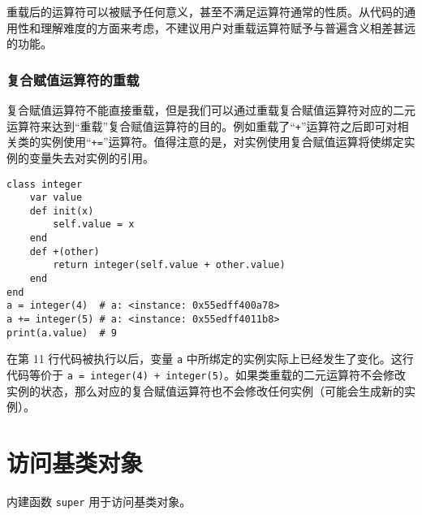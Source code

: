 重载后的运算符可以被赋予任何意义，甚至不满足运算符通常的性质。从代码的通用性和理解难度的方面来考虑，不建议用户对重载运算符赋予与普遍含义相差甚远的功能。

\subsubsection{复合赋值运算符的重载}

复合赋值运算符不能直接重载，但是我们可以通过重载复合赋值运算符对应的二元运算符来达到``重载''复合赋值运算符的目的。例如重载了``\texttt{+}''运算符之后即可对相关类的实例使用``\texttt{+=}''运算符。值得注意的是，对实例使用复合赋值运算将使绑定实例的变量失去对实例的引用。
\begin{lstlisting}[language=berry]
class integer
    var value
    def init(x)
        self.value = x
    end
    def +(other)
        return integer(self.value + other.value)
    end
end
a = integer(4)  # a: <instance: 0x55edff400a78>
a += integer(5) # a: <instance: 0x55edff4011b8>
print(a.value)  # 9
\end{lstlisting}

在第 11 行代码被执行以后，变量 \texttt{a} 中所绑定的实例实际上已经发生了变化。这行代码等价于 \texttt{a = integer(4) + integer(5)}。如果类重载的二元运算符不会修改实例的状态，那么对应的复合赋值运算符也不会修改任何实例（可能会生成新的实例）。

\section{访问基类对象}

内建函数 \texttt{super} 用于访问基类对象。
